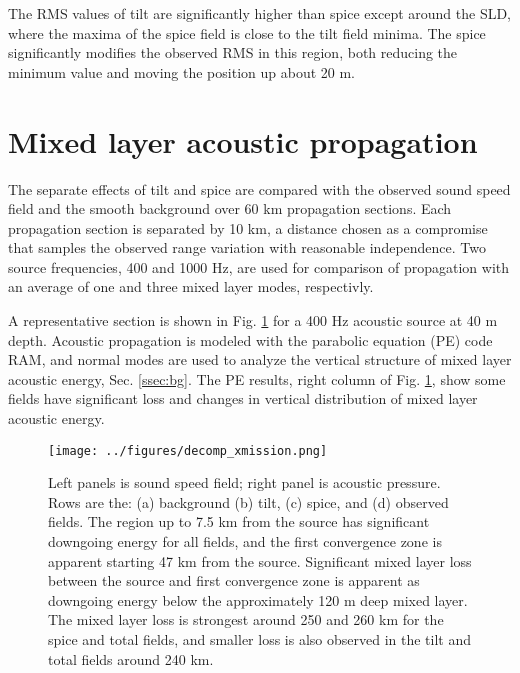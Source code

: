 \documentclass[preprint,NumberedRefs]{JASA}
\begin{document}
The RMS values of tilt are significantly higher than spice except around the SLD, where the maxima of the spice field is close to the tilt field minima. The spice significantly modifies the observed RMS in this region, both reducing the minimum value and moving the position up about 20 m.

\section{\label{sec:propagation}Mixed layer acoustic propagation}
The separate effects of tilt and spice are compared with the observed sound speed field and the smooth background over 60 km propagation sections. Each propagation section is separated by 10 km, a distance chosen as a compromise that samples the observed range variation with reasonable independence. Two source frequencies, 400 and 1000 Hz, are used for comparison of propagation with an average of one and three mixed layer modes, respectivly.

A representative section is shown in Fig. \ref{fig:decomp_x} for a 400 Hz acoustic source at 40 m depth. Acoustic propagation is modeled with the parabolic equation (PE) code RAM\citep{collins93}, and normal modes are used to analyze the vertical structure of mixed layer acoustic energy, Sec. \ref{ssec:bg}. The PE results, right column  of Fig. \ref{fig:decomp_x}, show some fields have significant loss and changes in vertical distribution of mixed layer acoustic energy.

\begin{figure}
\texttt{[image: ../figures/decomp\_xmission.png]}
    \caption{\label{fig:decomp_x}{Left panels is sound speed field; right panel is acoustic pressure. Rows are the: (a) background (b) tilt, (c) spice, and (d) observed fields. The region up to 7.5 km from the source has significant downgoing energy for all fields, and the first convergence zone is apparent starting 47 km from the source. Significant mixed layer loss between the source and first convergence zone is apparent as downgoing energy below the approximately 120 m deep mixed layer. The mixed layer loss is strongest around 250 and 260 km for the spice and total fields, and smaller loss is also observed in the tilt and total fields around 240 km.}}
\end{figure}
\end{document}
